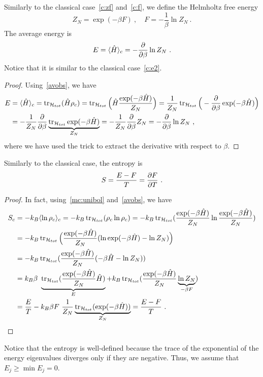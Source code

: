     Similarly to the classical case~\eqref{c:zf} and~\eqref{c:f}, we define the Helmholtz free energy
    \begin{equation}\label{qgc:cf}
        Z_N = \exp(- \beta F) ~, \quad F = - \frac{1}{\beta} \ln Z_N ~.
    \end{equation}
    The average energy is 
    \begin{equation}\label{qgc:ce}
        E = \langle\hat H\rangle_c = - \frac{\partial}{\partial\beta} \ln Z_N ~.
    \end{equation}
    Notice that it is similar to the classical case~\eqref{c:e2}.
    \begin{proof}
        Using~\eqref{avobs}, we have
        \begin{equation*}
        \begin{aligned}
            E & = \langle\hat H\rangle_c  = \operatorname{tr}_{\mathcal H_{tot}} (\hat H \rho_c) = \operatorname{tr}_{\mathcal H_{tot}} \Big ( \hat H \frac{\exp(- \beta \hat H)}{Z_N} \Big ) = \frac{1}{Z_N} \operatorname{tr}_{\mathcal H_{tot}} \Big (- \frac{\partial}{\partial\beta} \exp(- \beta \hat H) \Big) \\ & = - \frac{1}{Z_N} \frac{\partial}{\partial\beta} \underbrace{\operatorname{tr}_{\mathcal H_{tot}} \exp(- \beta \hat H)}_{Z_N} = - \frac{1}{Z_N} \frac{\partial}{\partial\beta} Z_N = - \frac{\partial}{\partial\beta} \ln Z_N ~,
        \end{aligned}
        \end{equation*}
        where we have used the trick to extract the derivative with respect to $\beta$.
    \end{proof}

    Similarly to the classical case, the entropy is 
    \begin{equation*}
        S = \frac{E - F}{T} = \frac{\partial F}{\partial T} ~.
    \end{equation*}
    \begin{proof}
        In fact, using~\eqref{mc:unibol} and~\eqref{avobs}, we have
        \begin{equation*}
        \begin{aligned}
            S_c & = - k_B \langle\ln \rho_c\rangle_c = - k_B \operatorname{tr}_{\mathcal H_{tot}} (\rho_c \ln \rho_c) = - k_B \operatorname{tr}_{\mathcal H_{tot}} (\frac{\exp(- \beta \hat H)}{Z_N} \ln \frac{\exp(- \beta \hat H)}{Z_N}) \\ & = - k_B \operatorname{tr}_{\mathcal H_{tot}} \Big (\frac{\exp(- \beta \hat H)}{Z_N} (\ln \exp(- \beta \hat H) - \ln Z_N) \Big ) \\ & = - k_B \operatorname{tr}_{\mathcal H_{tot}} (\frac{\exp(- \beta \hat H)}{Z_N} (- \beta \hat H - \ln Z_N)) \\ & = k_B \beta ~ \underbrace{\operatorname{tr}_{\mathcal H_{tot}} (\frac{\exp(- \beta \hat H)}{Z_N} \hat H )}_E + k_B \operatorname{tr}_{\mathcal H_{tot}} (\frac{\exp(- \beta \hat H)}{Z_N} \underbrace{\ln Z_N}_{- \beta F} ) \\ & = \frac{E}{T} - k_B \beta F ~ \frac{1}{Z_N} \underbrace{\operatorname{tr}_{\mathcal H_{tot}} (\exp(- \beta \hat H))}_{Z_N} = \frac{E-F}{T} ~.
        \end{aligned}
        \end{equation*}
    \end{proof}
    Notice that the entropy is well-defined because the trace of the exponential of the energy eigenvalues diverges only if they are negative. Thus, we assume that $E_j \geq \min E_j = 0$.

